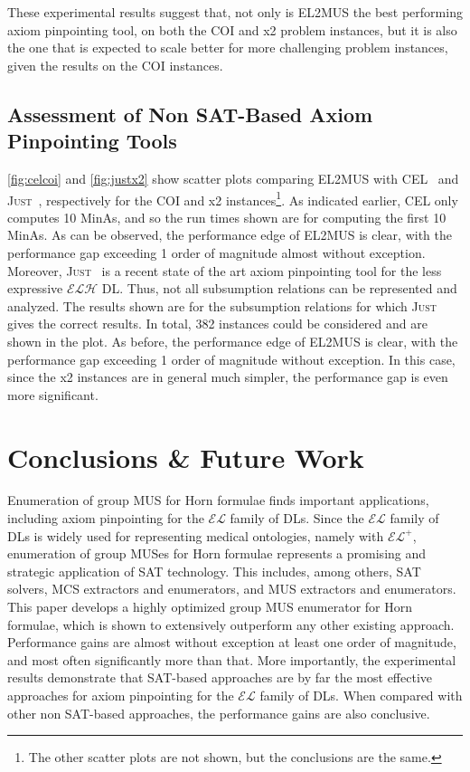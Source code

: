 \documentclass{llncs}
\newcommand{\fml}[1]{{\mathcal{#1}}}
\newcommand{\elplus}{$\fml{EL}^{+}$\xspace}
\newcommand{\elplain}{$\fml{EL}$\xspace}
\newcommand{\just}{\textsc{Just}\xspace}
\begin{document}
These experimental results suggest that, not only is EL2MUS the best
performing axiom pinpointing tool, on both the COI and x2 problem
instances, but it is also the one that is expected to scale better for
more challenging problem instances, given the results on the COI
instances.


\subsection{Assessment of Non SAT-Based Axiom Pinpointing Tools}

\autoref{fig:celcoi} and \autoref{fig:justx2} show scatter plots comparing EL2MUS with
CEL~\cite{baader-ijcar06} and \just~\cite{ludwig-ore14}, respectively
for the COI and x2 instances\footnote{The other
  scatter plots are not shown, but the conclusions are the
  same.}.
As indicated earlier, CEL only computes 10 MinAs, and so the run times
shown are for computing the first 10 MinAs. As can be observed,
the performance edge of EL2MUS is clear, with the performance gap
exceeding 1 order of magnitude almost without exception.
Moreover, \just~\cite{ludwig-ore14} is a recent state of the art axiom
pinpointing tool for the less expressive $\fml{ELH}$ DL. Thus, not
all subsumption relations can be represented and analyzed. The results
shown are for the subsumption relations for which \just gives the
correct results. In total, 382 instances could be considered and are
shown in the plot. As before, the performance edge of EL2MUS is
clear, with the performance gap exceeding 1 order of magnitude without
exception. In this case, since  the x2 instances are in general much
simpler, the performance gap is even more significant.


\section{Conclusions \& Future Work} \label{sec:conc} 

Enumeration of group MUS for Horn formulae finds important
applications, including axiom pinpointing for the \elplain family of
DLs. Since the \elplain family of DLs is widely used for representing
medical ontologies, namely with \elplus, enumeration of group MUSes
for Horn formulae represents a promising and strategic application of
SAT technology. This includes, among others, SAT solvers, MCS extractors and enumerators, and MUS extractors and 
enumerators.
This paper develops a highly optimized group MUS enumerator for Horn
formulae, which is shown to extensively outperform any other existing
approach. Performance gains are almost without exception at least one
order of magnitude, and most often significantly more than that.
More importantly, the experimental results demonstrate that SAT-based
approaches are by far the most effective approaches for axiom
pinpointing for the \elplain family of DLs. When compared with other
non SAT-based approaches, the performance gains are also conclusive.
\end{document}
